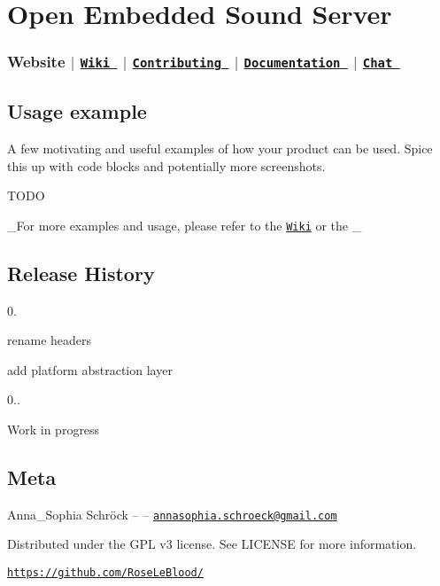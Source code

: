    \section*{Open Embedded Sound Server}

 \subsubsection*{Website   $\vert$  \href{https://github.com/RoseLeBlood/openess/wiki}{\tt Wiki }  $\vert$  \href{https://github.com/RoseLeBlood/openess/blob/master/CONTRIBUTING.md}{\tt Contributing }  $\vert$  \href{https://roseleblood.github.io/openess/html/d3/dcc/md__r_e_a_d_m_e.html}{\tt Documentation }  $\vert$  \href{https://webchat.freenode.net/?channels=openess}{\tt Chat } }

  

\subsection*{Usage example}

A few motivating and useful examples of how your product can be used. Spice this up with code blocks and potentially more screenshots.

T\+O\+DO

\+\_\+\+For more examples and usage, please refer to the \href{https://github.com/RoseLeBlood/openess/wiki}{\tt Wiki} or the \+\_\+

\subsection*{Release History}


\begin{DoxyItemize}
\item 0.
\begin{DoxyItemize}
\item rename headers
\item add platform abstraction layer
\end{DoxyItemize}
\item 0..
\begin{DoxyItemize}
\item Work in progress
\end{DoxyItemize}
\end{DoxyItemize}

\subsection*{Meta}

Anna\+\_\+\+Sophia Schröck – \href{https://twitter.com/padersophia}{\tt } – \href{mailto:annasophia.schroeck@gmail.com}{\tt annasophia.\+schroeck@gmail.\+com}

Distributed under the G\+PL v3 license. See {\ttfamily L\+I\+C\+E\+N\+SE} for more information.

\href{https://github.com/RoseLeBlood/}{\tt https\+://github.\+com/\+Rose\+Le\+Blood/} 